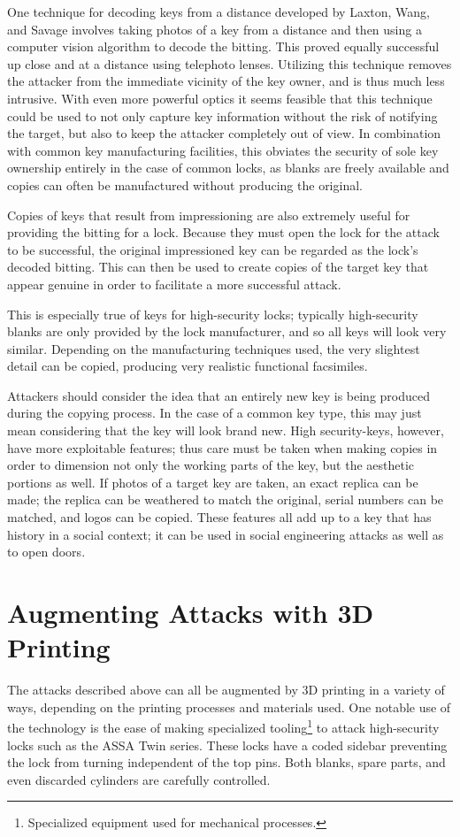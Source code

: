 \documentclass{acm_proc_article-sp}
\begin{document}
One technique for decoding keys from a distance developed by Laxton, Wang, and Savage involves taking photos of a key from a distance and then using a computer vision algorithm to decode the bitting. This proved equally successful up close and at a distance using telephoto lenses. Utilizing this technique removes the attacker from the immediate vicinity of the key owner, and is thus much less intrusive. With even more powerful optics it seems feasible that this technique could be used to not only capture key information without the risk of notifying the target, but also to keep the attacker completely out of view. In combination with common key manufacturing facilities, this obviates the security of sole key ownership entirely in the case of common locks, as blanks are freely available and copies can often be manufactured without producing the original.

Copies of keys that result from impressioning are also extremely useful for providing the bitting for a lock. Because they must open the lock for the attack to be successful, the original impressioned key can be regarded as the lock's decoded bitting. This can then be used to create copies of the target key that appear genuine in order to facilitate a more successful attack.

This is especially true of keys for high-security locks; typically high-security blanks are only provided by the lock manufacturer, and so all keys will look very similar. Depending on the manufacturing techniques used, the very slightest detail can be copied, producing very realistic functional facsimiles.

Attackers should consider the idea that an entirely new key is being produced during the copying process. In the case of a common key type, this may just mean considering that the key will look brand new. High security-keys, however, have more exploitable features; thus care must be taken when making copies in order to dimension not only the working parts of the key, but the aesthetic portions as well. If photos of a target key are taken, an exact replica can be made; the replica can be weathered to match the original, serial numbers can be matched, and logos can be copied. These features all add up to a key that has history in a social context; it can be used in social engineering attacks as well as to open doors.

\section{Augmenting Attacks with 3D Printing}
The attacks described above can all be augmented by 3D printing in a variety of ways, depending on the printing processes and materials used. One notable use of the technology is the ease of making specialized tooling\footnote{Specialized equipment used for mechanical processes.} to attack high-security locks such as the ASSA Twin series. These locks have a coded sidebar preventing the lock from turning independent of the top pins. Both blanks, spare parts, and even discarded cylinders are carefully controlled. 
\end{document}
